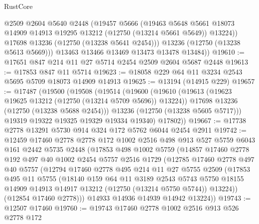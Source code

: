 \begin{lexlean}{RustCore}
\begin{coremodule}
            @2509
            @2604
            @5640
            @2448
            (@19457
              @5666
              (@19463
                @5648
                @5661
                @18073
                @14909
                @14913
                @19295
                @13212
                (@12750 (@13214 @5661 @5649))
                @13224))
            @17698
            @13236
            (@12750 (@13238 @5641 @2454)))
          @13236
          (@12750 (@13238 @5613 @5669)))
        @13463
        @13466
        @13469
        @13473
        @13478
        @13484))
@19610 := @17651 @847 @214 @11 @27 @5714 @2454 @2509 @2604 @5687 @2448
@19613 := @17853 @847 @11 @5714
@19623 := @18058 @229 @64 @11 @3234 @2543 @5695 @5709 @18073 @14909 @14913
@19625 := @13194 (@14915 @229)
@19657 := @17487
    (@19500
      (@19508
        (@19514
          (@19600
            (@19610
              (@19613 (@19623 @19625 @13212 (@12750 (@13214 @5709 @5696)) @13224))
              @17698
              @13236
              (@12750 (@13238 @5688 @2454)))
            @13236
            (@12750 (@13238 @5605 @5717)))
          @19319
          @19322
          @19325
          @19329
          @19334
          @19340)
        @17802))
@19667 := @17738 @2778 @13291 @5730 @914 @324 @172 @5762 @6044 @2454 @2911
@19742 := @12459
    @17460
    @2778
    @2778
    @172
    @1002
    @2516
    @498
    @913
    @527
    @5759
    @6043
    @161
    @2442
    @5735
    @2448
    (@17853
      @498
      @1002
      @5759
      (@14857
        @17460
        @2778
        @192
        @497
        @40
        @1002
        @2454
        @5757
        @2516
        @1729
        (@12785
          @17460
          @2778
          @497
          @40
          @5757
          (@12794
            @17460
            @2778
            @495
            @214
            @11
            @27
            @5755
            @2509
            (@17853
              @495
              @11
              @5755
              (@18140
                @159
                @64
                @11
                @3189
                @2543
                @5743
                @5750
                @18155
                @14909
                @14913
                @14917
                @13212
                (@12750 (@13214 @5750 @5744))
                @13224))
            (@12854 @17460 @2778)))
        @14933
        @14936
        @14939
        @14942
        @13224))
@19743 := @12507 @17460
@19760 := @19743
    @17460
    @2778
    @1002
    @2516
    @913
    @526
    @2778
    @172

\end{coremodule}
\end{lexlean}
